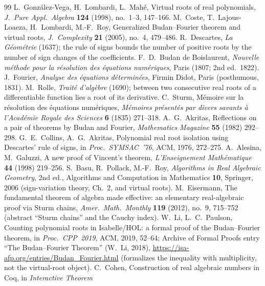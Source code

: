 \documentclass[11pt]{article}
\begin{document}
\begin{thebibliography}{99}\small
{} L.~Gonz\'alez-Vega, H.~Lombardi, L.~Mah\'e, Virtual roots of real polynomials,
\emph{J.~Pure Appl.\ Algebra} \textbf{124} (1998), no.~1--3, 147--166.
 M.~Coste, T.~Lajous-Loaeza, H.~Lombardi, M.-F.~Roy, Generalized Budan--Fourier theorem
and virtual roots, \emph{J.~Complexity} \textbf{21} (2005), no.~4, 479--486.
 R.~Descartes, \emph{La G\'eom\'etrie} (1637); the rule of signs bounds the number
of positive roots by the number of sign changes of the coefficients.
 F.~D.~Budan de Boislaurent, \emph{Nouvelle m\'ethode pour la r\'esolution des
\'equations num\'eriques}, Paris (1807; 2nd ed.\ 1822).
 J.~Fourier, \emph{Analyse des \'equations d\'etermin\'ees}, Firmin Didot, Paris
(posthumous, 1831).
 M.~Rolle, \emph{Trait\'e d'alg\`ebre} (1690); between two consecutive real roots of a
differentiable function lies a root of its derivative.
 C.~Sturm, M\'emoire sur la r\'esolution des \'equations num\'eriques, \emph{M\'emoires
pr\'esent\'es par divers savants \`a l'Acad\'emie Royale des Sciences} \textbf{6} (1835) 271--318.
 A.~G.~Akritas, Reflections on a pair of theorems by Budan and Fourier, \emph{Mathematics
Magazine} \textbf{55} (1982) 292--298.
 G.~E.~Collins, A.~G.~Akritas, Polynomial real root isolation using Descartes'
rule of signs, in \emph{Proc.\ SYMSAC~'76}, ACM, 1976, 272--275.
 A.~Alesina, M.~Galuzzi, A new proof of Vincent's theorem, \emph{L'Enseignement
Math\'ematique} \textbf{44} (1998) 219--256.
 S.~Basu, R.~Pollack, M.-F.~Roy, \emph{Algorithms in Real Algebraic Geometry}, 2nd ed.,
Algorithms and Computation in Mathematics \textbf{10}, Springer, 2006 (sign-variation theory, Ch.~2,
and virtual roots).
 M.~Eisermann, The fundamental theorem of algebra made effective: an elementary
real-algebraic proof via Sturm chains, \emph{Amer.\ Math.\ Monthly} \textbf{119} (2012), no.~9,
715--752 (abstract ``Sturm chains'' and the Cauchy index).
 W.~Li, L.~C.~Paulson, Counting polynomial roots in Isabelle/HOL: a formal proof of the
Budan--Fourier theorem, in \emph{Proc.\ CPP~2019}, ACM, 2019, 52--64; Archive of Formal Proofs entry
``The Budan--Fourier Theorem'' (W.~Li, 2018), \url{https://isa-afp.org/entries/Budan_Fourier.html}
(formalizes the inequality with multiplicity, not the virtual-root object).
 C.~Cohen, Construction of real algebraic numbers in Coq, in \emph{Interactive Theorem
}
\end{thebibliography}
\end{document}
